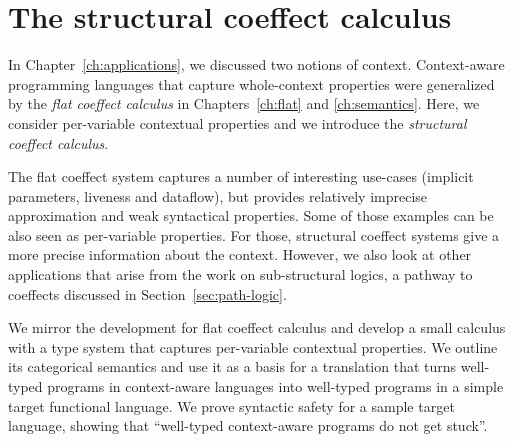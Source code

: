 \chapter{The structural coeffect calculus}
\label{ch:structural}

In Chapter~\ref{ch:applications}, we discussed two notions of context. Context-aware programming
languages that capture whole-context properties were generalized by the \emph{flat coeffect
calculus} in Chapters~\ref{ch:flat} and \ref{ch:semantics}. Here, we consider per-variable
contextual properties and we introduce the \emph{structural coeffect calculus}.

The flat coeffect system captures a number of interesting use-cases (implicit parameters, liveness
and dataflow), but provides relatively imprecise approximation and weak syntactical properties.
Some of those examples can be also seen as per-variable properties. For those, structural coeffect
systems give a more precise information about the context. However, we also look at other applications
that arise from the work on sub-structural logics, a pathway to coeffects discussed in
Section~\ref{sec:path-logic}.

We mirror the development for flat coeffect calculus and develop a small calculus with a type system
that captures per-variable contextual properties. We outline its categorical semantics and use it as
a basis for a translation that turns well-typed programs in context-aware languages into well-typed
programs in a simple target functional language. We prove syntactic safety for a sample target
language, showing that ``well-typed context-aware programs do not get stuck''.

